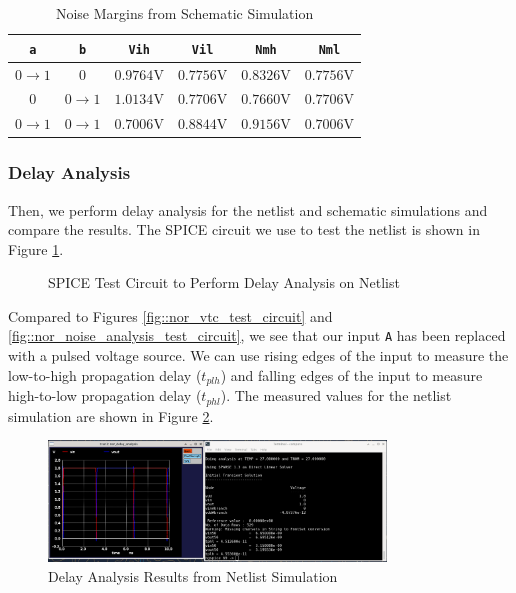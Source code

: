 \documentclass{article}
\begin{document}
	\begin{table}[H]
	\begin{center}
	\caption{Noise Margins from Schematic Simulation}
	\label{table::nor_gate_noise_analysis_schem}
	\begin{tabular}{| c | c | c | c | c | c |}
		\hline
		\texttt{a} & \texttt{b} & \texttt{Vih} & \texttt{Vil} & \texttt{Nmh} & \texttt{Nml} \\
		\hline	
		$0 \rightarrow 1$ & $0$ & $0.9764 \text{V}$ & $0.7756 \text{V}$ & $0.8326 \text{V}$ & $0.7756 \text{V}$\\
		\hline	
		$0$ & $0 \rightarrow 1$ & $1.0134 \text{V}$ & $0.7706 \text{V}$ & $0.7660 \text{V}$ & $0.7706 \text{V}$\\
		\hline	
		$0 \rightarrow 1$ & $0 \rightarrow 1$ & $0.7006 \text{V}$ & $0.8844 \text{V}$ & $0.9156 \text{V}$ & $0.7006 \text{V}$\\
		\hline
	\end{tabular}
	\end{center}
	\end{table}
	
	\subsubsection{Delay Analysis}
	
	Then, we perform delay analysis for the netlist and schematic simulations and compare the results. The SPICE circuit we use to test the netlist is shown in Figure \ref{fig::nor_delay_analysis_test_circuit}.
	
	\begin{figure}[H]
		
		\caption{SPICE Test Circuit to Perform Delay Analysis on Netlist}
		\label{fig::nor_delay_analysis_test_circuit}
	\end{figure}
	
	\noindent Compared to Figures \ref{fig::nor_vtc_test_circuit} and \ref{fig::nor_noise_analysis_test_circuit}, we see that our input \texttt{A} has been replaced with a pulsed voltage source. We can use rising edges of the input to measure the low-to-high propagation delay ($t_{plh}$) and falling edges of the input to measure high-to-low propagation delay ($t_{phl}$). The measured values for the netlist simulation are shown in Figure \ref{fig::nor_delay_analysis}.
	
	\begin{figure}[H]
		\centerline{\includegraphics[width=0.8\textwidth]{nor_delay_analysis.png}}
		\caption{Delay Analysis Results from Netlist Simulation}
		\label{fig::nor_delay_analysis}
	\end{figure}
	
\end{document}

